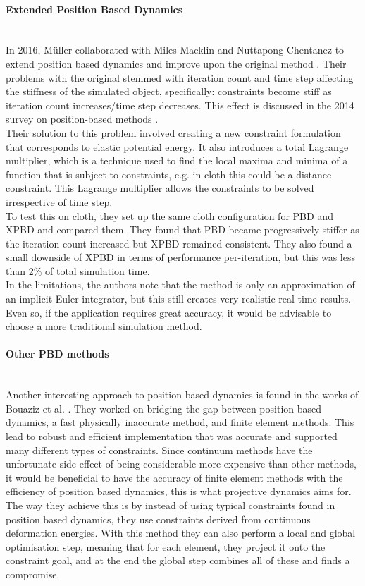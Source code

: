 \documentclass[12pt,a4paper]{article}
\begin{document}
\paragraph{Extended Position Based Dynamics} \mbox{} \\
In 2016, Müller collaborated with Miles Macklin and Nuttapong Chentanez to extend position based dynamics and improve upon the original method \cite{macklin2016xpbd}. Their problems with the original stemmed with iteration count and time step affecting the stiffness of the simulated object, specifically: constraints become stiff as iteration count increases/time step decreases. This effect is discussed in the 2014 survey on position-based methods \cite{bender2014survey}. \\
Their solution to this problem involved creating a new constraint formulation that corresponds to elastic potential energy. It also introduces a total Lagrange multiplier, which is a technique used to find the local maxima and minima of a function that is subject to constraints, e.g. in cloth this could be a distance constraint. This Lagrange multiplier allows the constraints to be solved irrespective of time step.\\
To test this on cloth, they set up the same cloth configuration for PBD and XPBD and compared them. They found that PBD became progressively stiffer as the iteration count increased but XPBD remained consistent. They also found a small downside of XPBD in terms of performance per-iteration, but this was less than 2\% of total simulation time. \\

In the limitations, the authors note that the method is only an approximation of an implicit Euler integrator, but this still creates very realistic real time results. Even so, if the application requires great accuracy, it would be advisable to choose a more traditional simulation method.

\label{otherMethods}
\paragraph{Other PBD methods} \mbox{} \\
Another interesting approach to position based dynamics is found in the works of Bouaziz et al. \cite{projectivedynamics}. They worked on bridging the gap between position based dynamics, a fast physically inaccurate method, and finite element methods. This lead to robust and efficient implementation that was accurate and supported many different types of constraints. Since continuum methods have the unfortunate side effect of being considerable more expensive than other methods, it would be beneficial to have the accuracy of finite element methods with the efficiency of position based dynamics, this is what projective dynamics aims for. The way they achieve this is by instead of using typical constraints found in position based dynamics, they use constraints derived from continuous deformation energies. With this method they can also perform a local and global optimisation step, meaning that for each element, they project it onto the constraint goal, and at the end the global step combines all of these and finds a compromise. 
\end{document}
